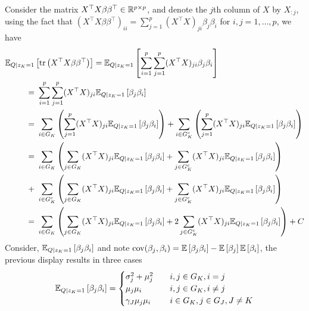 \documentclass[12pt]{article}
\begin{document}
Consider the matrix $ X^\top X \beta \beta^\top \in \mathbb{R}^{p \times p} $, and denote the $j$th column of $X$ by $X_{:j}$, using the fact that $\left( X^\top X \beta \beta^\top \right)_{ii} = \sum_{j=1}^{p} (X^\top X)_{ji} \beta_j \beta_i $ for $i,j = 1, \dots, p$, we have
\begin{align}
    \E_{Q | z_K = 1} & \left[ 
	\tr \left( X^\top X \beta \beta^\top \right) 
    \right]
=
    \E_{Q | z_K = 1} \left[ 
	\sum_{i=1}^p \sum_{j=1}^{p} (X^\top X)_{ji} \beta_j \beta_i 
    \right] \nonumber \\
=&\
    \sum_{i=1}^p \sum_{j=1}^{p} (X^\top X)_{ji} 
    \E_{Q | z_K = 1} \left[ \beta_j \beta_i \right] 
    \nonumber \\
=&\
    \sum_{i \in G_K} \left(
	\sum_{j=1}^{p} (X^\top X)_{ji} 
	\E_{Q | z_K = 1} \left[ \beta_j \beta_i \right]
    \right)
+
    \sum_{i \in G_K^c} \left(
	\sum_{j=1}^{p} (X^\top X)_{ji} 
	\E_{Q | z_K = 1} \left[ \beta_j \beta_i \right] 
    \right)
    \nonumber \\
=&\
    \sum_{i \in G_K} \left( 
	\sum_{j \in G_K} (X^\top X)_{ji} 
	    \E_{Q | z_K = 1} \left[ \beta_j \beta_i \right] 
	+ 
	\sum_{j \in G_K^c} (X^\top X)_{ji} 
	    \E_{Q | z_K = 1} \left[ \beta_j \beta_i \right] 
    \right ) \nonumber \\
+&\ 
    \sum_{i \in G_K^c} \left( 
	\sum_{j \in G_K} (X^\top X)_{ji} 
	    \E_{Q | z_K = 1} \left[ \beta_j \beta_i \right] 
	+ 
	\sum_{j \in G_K^c} (X^\top X)_{ji} 
	    \E_{Q | z_K = 1} \left[ \beta_j \beta_i \right] 
    \right ) \nonumber \\
=&\
    \sum_{i \in G_K} \left( 
	\sum_{j \in G_K} (X^\top X)_{ji} 
	    \E_{Q | z_K = 1} \left[ \beta_j \beta_i \right] 
	+ 
	2 \sum_{j \in G_K^c} (X^\top X)_{ji} 
	    \E_{Q | z_K = 1} \left[ \beta_j \beta_i \right] 
    \right ) + C \nonumber
\end{align}
Consider, $ \mathbb{E}_{Q | z_K = 1} \left[ \beta_j \beta_i \right] $ and note $\operatorname{cov}(\beta_j, \beta_i) = \mathbb{E}\left[ \beta_j \beta_i \right] - \mathbb{E} \left[\beta_j \right] \mathbb{E} \left[ \beta_i \right]$, the previous display results in three cases
\begin{equation}
    \mathbb{E}_{Q | z_K = 1} \left[ \beta_j \beta_i \right] = \begin{cases}
	\sigma_{j}^2 + \mu_{j}^2 	& \quad i,j \in G_K, i=j \\
	\mu_{j}\mu_{i} 			& \quad i,j \in G_K, i \neq j \\
	\gamma_J \mu_{j}\mu_{i} 	& \quad i \in G_K, j \in G_J, J \neq K
    \end{cases}
\end{equation}
\end{document}
